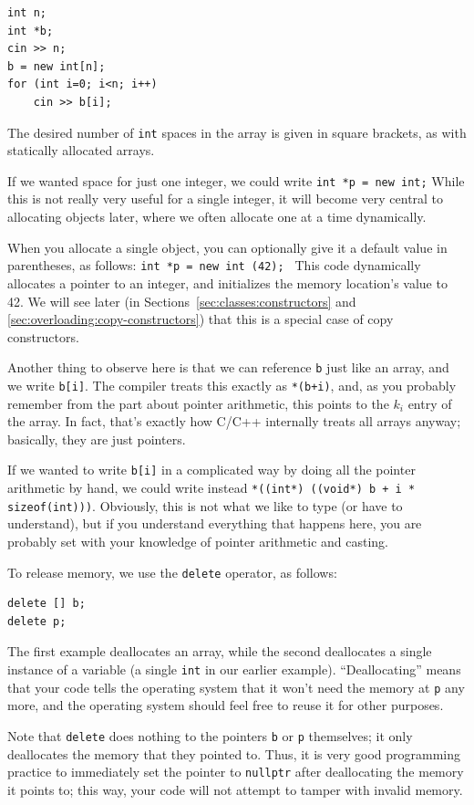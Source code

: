\begin{verbatim}
int n;
int *b;
cin >> n;
b = new int[n];
for (int i=0; i<n; i++)
    cin >> b[i];
\end{verbatim}
The desired number of \texttt{int} spaces in the array is given in
square brackets, as with statically allocated arrays.

If we wanted space for just one integer, we could write
\texttt{int *p = new int;}
While this is not really very useful for a single integer,
it will become very central to allocating objects later,
where we often allocate one at a time dynamically.

When you allocate a single object, you can optionally give it a
default value in parentheses, as follows:
\texttt{int *p = new int (42); }
This code dynamically allocates a pointer to an integer,
and initializes the memory location's value to 42.
We will see later (in Sections~\ref{sec:classes:constructors} and
\ref{sec:overloading:copy-constructors}) that this is a special case
of copy constructors.

Another thing to observe here is that we can reference \texttt{b} just
like an array, and we write \texttt{b[i]}.
The compiler treats this exactly as \texttt{*(b+i)}, and, as you
probably remember from the part about pointer arithmetic, this points
to the $k_i$ entry of the array.
In fact, that's exactly how C/C++ internally treats all arrays anyway;
basically, they are just pointers.

If we wanted to write \texttt{b[i]} in a complicated way by doing all
the pointer arithmetic by hand, we could write instead
\texttt{*((int*) ((void*) b + i * sizeof(int)))}.
Obviously, this is not what we like to type (or have to understand),
but if you understand everything that happens here, you are probably
set with your knowledge of pointer arithmetic and casting.

\smallskip

To release memory, we use the \texttt{delete} operator, as follows:
\begin{verbatim}
delete [] b;
delete p;
\end{verbatim}
The first example deallocates an array,
while the second deallocates a single instance of a variable
(a single \texttt{int} in our earlier example).
``Deallocating'' means that your code tells the operating system that
it won't need the memory at \texttt{p} any more, and the operating
system should feel free to reuse it for other purposes.

Note that \texttt{delete} does nothing to the pointers \texttt{b} or
\texttt{p} themselves;
it only deallocates the memory that they pointed to.
Thus, it is very good programming practice to immediately set the
pointer to \texttt{nullptr} after deallocating the memory it points to;
this way, your code will not attempt to tamper with invalid memory.

